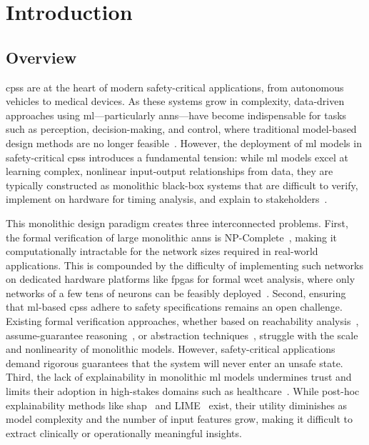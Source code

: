\chapter{Introduction}\label{chapter:introduction}
\glsresetall

\section{Overview}

\glspl{cps} are at the heart of modern safety-critical applications, from autonomous vehicles to medical devices. As these systems grow in complexity, data-driven approaches using \gls{ml}---particularly \glspl{ann}---have become indispensable for tasks such as perception, decision-making, and control, where traditional model-based design methods are no longer feasible~\cite{goodfellow_deep_2016}. However, the deployment of \gls{ml} models in safety-critical \glspl{cps} introduces a fundamental tension: while \gls{ml} models excel at learning complex, nonlinear input-output relationships from data, they are typically constructed as monolithic black-box systems that are difficult to verify, implement on hardware for timing analysis, and explain to stakeholders~\cite{yang_compositional_2020}.

This monolithic design paradigm creates three interconnected problems. First, the formal verification of large monolithic \glspl{ann} is NP-Complete~\cite{katz_reluplex_2017}, making it computationally intractable for the network sizes required in real-world applications. This is compounded by the difficulty of implementing such networks on dedicated hardware platforms like \glspl{fpga} for formal \gls{wcet} analysis, where only networks of a few tens of neurons can be feasibly deployed~\cite{saric_fpga-based_2020, nguyen_efficient_2018}. Second, ensuring that \gls{ml}-based \glspl{cps} adhere to safety specifications remains an open challenge. Existing formal verification approaches, whether based on reachability analysis~\cite{ivanov_compositional_2021}, assume-guarantee reasoning~\cite{pasareanu_compositional_2018}, or abstraction techniques~\cite{gehr_ai2_2018}, struggle with the scale and nonlinearity of monolithic models. However, safety-critical applications demand rigorous guarantees that the system will never enter an unsafe state. Third, the lack of explainability in monolithic \gls{ml} models undermines trust and limits their adoption in high-stakes domains such as healthcare~\cite{molnar_interpretable_nodate}. While post-hoc explainability methods like \gls{shap}~\cite{lundberg_unified_2017} and LIME~\cite{ribeiro_why_2016} exist, their utility diminishes as model complexity and the number of input features grow, making it difficult to extract clinically or operationally meaningful insights.


